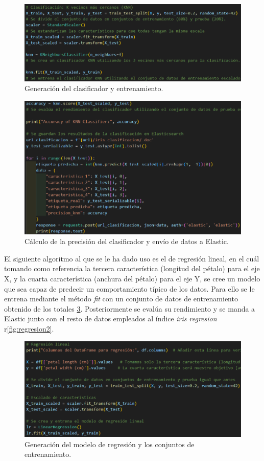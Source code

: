 \begin{figure}
    \centering
    \includegraphics[width=1\linewidth]{img/iris6.png}
    \caption{Generación del clasificador y entrenamiento.}
    \label{fig:clasificacion1}
\end{figure}
\begin{figure}
    \centering
    \includegraphics[width=1\linewidth]{img/iris7.png}
    \caption{Cálculo de la precisión del clasificador y envío de datos a Elastic.}
    \label{fig:clasificacion2}
\end{figure}

El siguiente algoritmo al que se le ha dado uso es el de regresión lineal, en el cuál tomando como referencia la tercera característica (longitud del pétalo) para el eje X, y la cuarta característica (anchura del pétalo) para el eje Y, se cree un modelo que sea capaz de predecir un comportamiento típico de los datos. Para ello se le entrena mediante el método \textit{fit} con un conjunto de datos de entrenamiento obtenido de los totales \ref{fig:regresion1}. Posteriormente se evalúa su rendimiento y se manda a Elastic junto con el resto de datos empleados al índice \textit{iris regresion} r\ref{fig:regresion2}.
\begin{figure}
    \centering
    \includegraphics[width=1\linewidth]{img/iris8.png}
    \caption{Generación del modelo de regresión y los conjuntos de entrenamiento.}
    \label{fig:regresion1}
\end{figure}



